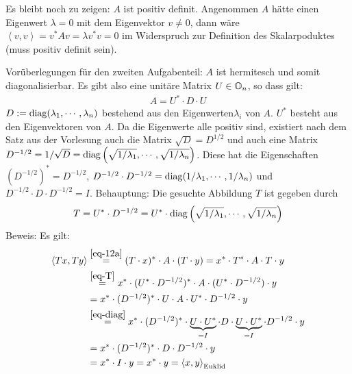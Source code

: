 Es bleibt noch zu zeigen: $A$ ist positiv definit. Angenommen $A$ hätte einen
Eigenwert $\lambda = 0$ mit dem Eigenvektor $v \ne 0$, dann wäre
$\left<v,v\right> = v^* A v = \lambda v^* v = 0$ im Widerspruch zur Definition
des Skalarpoduktes (muss positiv definit sein).

Vorüberlegungen für den zweiten Aufgabenteil: $A$ ist hermitesch und somit 
diagonalisierbar. Es gibt also eine unitäre Matrix $U \in \mathbb O_n$, so dass gilt:
\begin{align}
  \label{eq-diag}
  A = U^* \cdot D \cdot U
\end{align}
$D := \mathrm{diag}(\lambda_1, \cdots,\lambda_n)$ bestehend aus den Eigenwerten$\lambda_i$
von $A$. $U^*$ besteht aus den Eigenvektoren von $A$. Da die Eigenwerte alle
positiv sind, existiert nach dem Satz aus der Vorlesung auch die Matrix $\sqrt{D} = D^{1/2}$
und auch eine Matrix
$D^{-1/2} = 1 / \sqrt{D} = \mathrm{diag}\left(\sqrt{1 / \lambda_1}, \cdots, \sqrt{1 /\lambda_n}\right)$.
Diese hat die Eigenschaften $(D^{-1/2})^* = D^{-1/2}$, 
$D^{-1/2} \cdot D^{-1/2} = \mathrm{diag}(1/\lambda_1, \cdots, 1/ \lambda_n)$
und $D^{-1/2} \cdot D \cdot D^{-1/2} = I$. Behauptung: Die gesuchte Abbildung 
$T$ ist gegeben durch
\begin{align}
\label{eq-T}
 T =  U^* \cdot  D^{-1/2} 
   =  U^* \cdot \mathrm{diag}\left(\sqrt{1 / \lambda_1}, \cdots, \sqrt{1 /\lambda_n}\right)
\end{align}
Beweis: Es gilt:
\begin{align*}
   \left<T x,T y\right> &\overset{\eqref{eq-12a}}{=} (T\cdot x)^* \cdot A \cdot (T \cdot y)
    = x^* \cdot T^* \cdot A \cdot T  \cdot y \\
    & \overset{\eqref{eq-T}}{=}
      x^* \cdot (U^* \cdot  D^{-1/2})^* \cdot A \cdot (U^* \cdot  D^{-1/2}) \cdot y \\
    & = x^* \cdot (D^{-1/2})^* \cdot U \cdot A \cdot U^* \cdot  D^{-1/2} \cdot y \\
    & \overset{\eqref{eq-diag}}{=}
    x^* \cdot (D^{-1/2})^* \cdot \underbrace{U \cdot  U^*}_{= I} \cdot D \cdot 
    \underbrace{U \cdot  U^*}_{= I} \cdot  D^{-1/2} \cdot y \\
    & =  x^* \cdot (D^{-1/2})^* \cdot D  \cdot  D^{-1/2} \cdot y \\
    & = x^* \cdot I \cdot y =  x^* \cdot y =\left<x, y\right>_\text{Euklid}
\end{align*}

